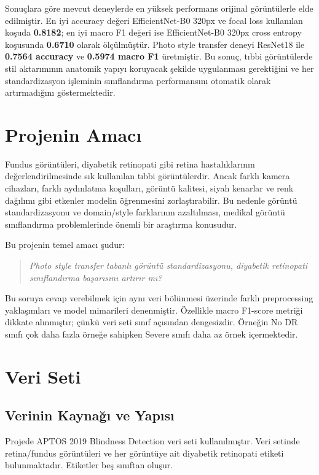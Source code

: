 \documentclass[12pt,a4paper]{article}
\begin{document}
Sonuçlara göre mevcut deneylerde en yüksek performans orijinal görüntülerle elde edilmiştir. En iyi accuracy değeri EfficientNet-B0 320px ve focal loss kullanılan koşuda \textbf{0.8182}; en iyi macro F1 değeri ise EfficientNet-B0 320px cross entropy koşusunda \textbf{0.6710} olarak ölçülmüştür. Photo style transfer deneyi ResNet18 ile \textbf{0.7564 accuracy} ve \textbf{0.5974 macro F1} üretmiştir. Bu sonuç, tıbbi görüntülerde stil aktarımının anatomik yapıyı koruyacak şekilde uygulanması gerektiğini ve her standardizasyon işleminin sınıflandırma performansını otomatik olarak artırmadığını göstermektedir.

\section{Projenin Amacı}

Fundus görüntüleri, diyabetik retinopati gibi retina hastalıklarının değerlendirilmesinde sık kullanılan tıbbi görüntülerdir. Ancak farklı kamera cihazları, farklı aydınlatma koşulları, görüntü kalitesi, siyah kenarlar ve renk dağılımı gibi etkenler modelin öğrenmesini zorlaştırabilir. Bu nedenle görüntü standardizasyonu ve domain/style farklarının azaltılması, medikal görüntü sınıflandırma problemlerinde önemli bir araştırma konusudur.

Bu projenin temel amacı şudur:

\begin{quote}
    \textit{Photo style transfer tabanlı görüntü standardizasyonu, diyabetik retinopati sınıflandırma başarısını artırır mı?}
\end{quote}

Bu soruya cevap verebilmek için aynı veri bölünmesi üzerinde farklı preprocessing yaklaşımları ve model mimarileri denenmiştir. Özellikle macro F1-score metriği dikkate alınmıştır; çünkü veri seti sınıf açısından dengesizdir. Örneğin No DR sınıfı çok daha fazla örneğe sahipken Severe sınıfı daha az örnek içermektedir.

\section{Veri Seti}

\subsection{Verinin Kaynağı ve Yapısı}

Projede APTOS 2019 Blindness Detection veri seti kullanılmıştır. Veri setinde retina/fundus görüntüleri ve her görüntüye ait diyabetik retinopati etiketi bulunmaktadır. Etiketler beş sınıftan oluşur.
\end{document}
